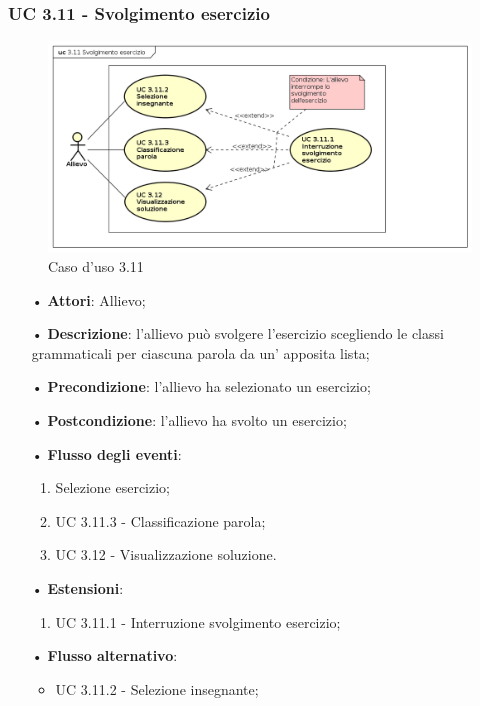 \subsubsection{UC 3.11 - Svolgimento esercizio}
\begin{figure}[H]
	\centering
	\includegraphics[width=17cm]{img/UC311.png} 
	\caption{Caso d'uso 3.11}\label{fig:311}
\end{figure}
\begin{itemize}
	\item[•]\textbf{Attori}: Allievo;
	\item[•]\textbf{Descrizione}: l'allievo può svolgere l'esercizio scegliendo le classi grammaticali per ciascuna parola da un' apposita lista;
	\item[•]\textbf{Precondizione}: l'allievo ha selezionato un esercizio;
	\item[•]\textbf{Postcondizione}: l'allievo ha svolto un esercizio;
	\item[•]\textbf{Flusso degli eventi}:
	\begin{enumerate}
		\item Selezione esercizio;
		\item UC 3.11.3 - Classificazione parola;
		\item UC 3.12 - Visualizzazione soluzione.
	\end{enumerate}
	\item[•]\textbf{Estensioni}:
	\begin{enumerate}
		\item UC 3.11.1 - Interruzione svolgimento esercizio;
	\end{enumerate}
	\item[•] \textbf{Flusso alternativo}:
	\begin{itemize}
				\item UC 3.11.2 - Selezione insegnante;
	\end{itemize}
\end{itemize}

